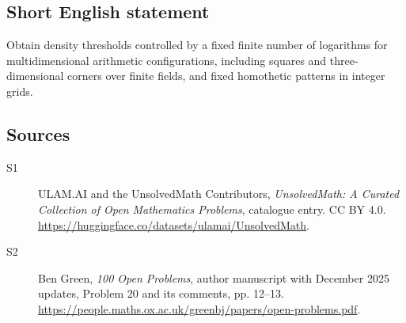 \documentclass[11pt]{article}
\begin{document}
\subsection{Short English statement}
Obtain density thresholds controlled by a fixed finite number of logarithms for multidimensional arithmetic configurations, including squares and three-dimensional corners over finite fields, and fixed homothetic patterns in integer grids.
\subsection{Sources}
\begin{description}
\item[\hypertarget{source:statement:1}{S1}] ULAM.AI and the UnsolvedMath Contributors, \emph{UnsolvedMath: A Curated Collection of Open Mathematics Problems}, catalogue entry. CC BY 4.0. \url{https://huggingface.co/datasets/ulamai/UnsolvedMath}.
\item[\hypertarget{source:statement:2}{S2}] Ben Green, \emph{100 Open Problems}, author manuscript with December 2025 updates, Problem 20 and its comments, pp. 12--13. \url{https://people.maths.ox.ac.uk/greenbj/papers/open-problems.pdf}.
\end{description}
\label{end:statement}
\end{document}
